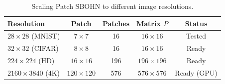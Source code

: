 \begin{table}[h]
\centering
\caption{Scaling Patch SBOHN to different image resolutions.}
\begin{tabular}{lcccc}
\hline
\textbf{Resolution} & \textbf{Patch} & \textbf{Patches} & \textbf{Matrix $P$} & \textbf{Status} \\
\hline
$28 \times 28$ (MNIST)   & $7 \times 7$   & 16  & $16 \times 16$   & Tested \\
$32 \times 32$ (CIFAR)   & $8 \times 8$   & 16  & $16 \times 16$   & Ready \\
$224 \times 224$ (HD)     & $16 \times 16$ & 196 & $196 \times 196$ & Ready \\
$2160 \times 3840$ (4K)   & $120 \times 120$ & 576 & $576 \times 576$ & Ready (GPU) \\
\hline
\end{tabular}
\end{table}

